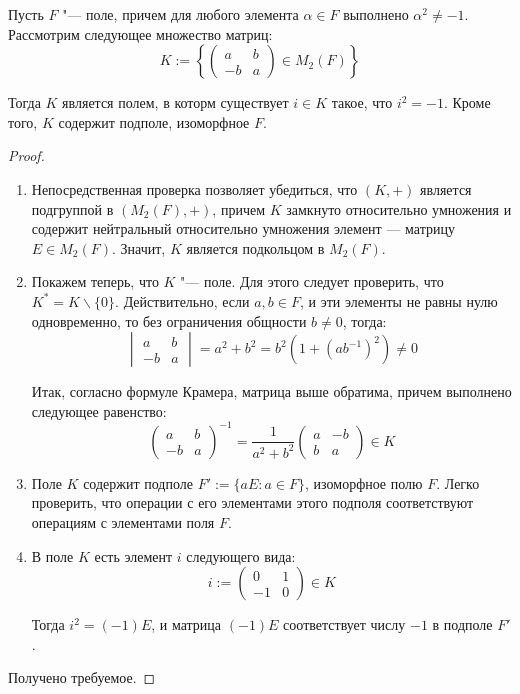 \begin{theorem}
	Пусть $F$ "--- поле, причем для любого элемента $\alpha \in F$ выполнено $\alpha^2 \ne -1$. Рассмотрим следующее множество матриц:
	\[K := \left\{\begin{pmatrix}
	a & b\\
	-b & a
	\end{pmatrix} \in M_2(F)\right\}\]
	
	Тогда $K$ является полем, в которм существует $i \in K$ такое, что $i^2 = -1$. Кроме того, $K$ содержит подполе, изоморфное $F$.
\end{theorem}

\begin{proof}~
	\begin{enumerate}
		\item Непосредственная проверка позволяет убедиться, что $(K, +)$ является подгруппой в $(M_2(F), +)$, причем $K$ замкнуто относительно умножения и содержит нейтральный относительно умножения элемент --- матрицу $E \in M_2(F)$. Значит, $K$ является подкольцом в $M_2(F)$.
		
		\item Покажем теперь, что $K$ "--- поле. Для этого следует проверить, что $K^* = K \backslash \{0\}$. Действительно, если $a, b \in F$, и эти элементы не равны нулю одновременно, то без ограничения общности $b \ne 0$, тогда:
		\[\begin{vmatrix}
		a & b\\
		-b & a
		\end{vmatrix} = a^{2} + b^{2} = b^2(1 + (ab^{-1})^2) \ne 0\]
		
		Итак, согласно формуле Крамера, матрица выше обратима, причем выполнено следующее равенство:
		\[\begin{pmatrix}
		a & b\\
		-b & a
		\end{pmatrix}^{-1} = \frac{1}{a^2 + b^2}\begin{pmatrix}
		a & -b\\
		b & a
		\end{pmatrix} \in K\]
		
		\item Поле $K$ содержит подполе $F' := \{aE: a \in F\}$, изоморфное полю $F$. Легко проверить, что операции с его элементами этого подполя соответствуют операциям с элементами поля $F$.
		
		\item В поле $K$ есть элемент $i$ следующего вида:
		\[i := \begin{pmatrix}
		0 & 1\\
		-1 & 0
		\end{pmatrix} \in K\]
		
		Тогда $i^2 = (-1)E$, и матрица $(-1)E$ соответствует числу $-1$ в подполе $F'$.
	\end{enumerate}
	
	Получено требуемое.
\end{proof}

